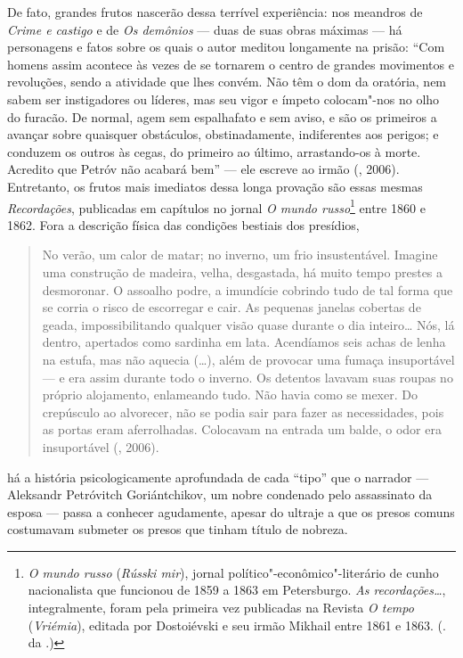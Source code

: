 De fato, grandes frutos nascerão dessa terrível
experiência: nos meandros de \emph{Crime e castigo} e de \emph{Os
demônios} --- duas de suas obras máximas --- há personagens e fatos sobre
os quais o autor meditou longamente na prisão: ``Com homens assim
acontece às vezes de se tornarem o centro de grandes movimentos e
revoluções, sendo a atividade que lhes convém. Não têm o dom da
oratória, nem sabem ser instigadores ou líderes, mas seu vigor e ímpeto
colocam"-nos no olho do furacão. De normal, agem sem espalhafato e sem
aviso, e são os primeiros a avançar sobre quaisquer obstáculos,
obstinadamente, indiferentes aos perigos; e conduzem os outros às cegas,
do primeiro ao último, arrastando-os à morte. Acredito que Petróv não
acabará bem'' --- ele escreve ao irmão (,
2006). Entretanto, os frutos mais imediatos dessa longa provação
são essas mesmas \emph{Recordações}, publicadas em capítulos no
jornal \emph{O mundo russo}\footnote{\emph{O mundo russo}
(\emph{Rússki mir}), jornal político"-econômico"-literário de
cunho nacionalista que funcionou de 1859 a 1863 em Petersburgo.
\emph{As recordações\ldots{}}, integralmente, foram pela primeira
vez publicadas na Revista \emph{O tempo} (\emph{Vriémia}), editada
por Dostoiévski e seu irmão Mikhail entre 1861 e 1863.
(. da .)} entre 1860 e 1862. Fora a descrição física das
condições bestiais dos presídios,

\begin{quotation}
No verão, um calor de matar; no inverno, um frio insustentável.
Imagine uma construção de madeira, velha, desgastada, há muito tempo
prestes a desmoronar. O assoalho podre, a imundície cobrindo tudo de tal
forma que se corria o risco de escorregar e cair. As pequenas janelas
cobertas de geada, impossibilitando qualquer visão quase durante o dia
inteiro\ldots{} Nós, lá dentro, apertados como sardinha em lata. Acendíamos
seis achas de lenha na estufa, mas não aquecia (\ldots{}), além de provocar
uma fumaça insuportável --- e era assim durante todo o inverno. Os
detentos lavavam suas roupas no próprio alojamento, enlameando tudo. Não
havia como se mexer. Do crepúsculo ao alvorecer, não se podia sair para
fazer as necessidades, pois as portas eram aferrolhadas. Colocavam na
entrada um balde, o odor era insuportável (, 2006).
\end{quotation}

\noindent{}há a história psicologicamente aprofundada de cada ``tipo''
que o narrador --- Aleksandr Petróvitch Goriántchikov, um nobre
condenado pelo assassinato da esposa --- passa a conhecer agudamente, apesar do ultraje a que os presos comuns costumavam submeter os presos que tinham título de nobreza.

